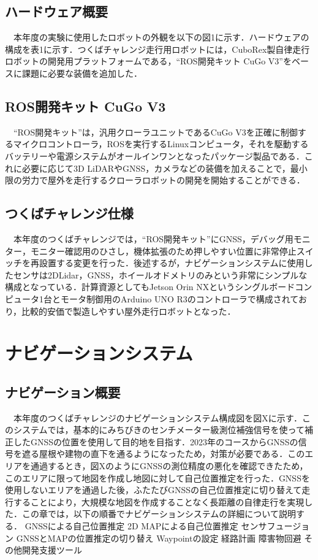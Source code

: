 \documentclass[platex,dvipdfmx]{rbproceedings}
\begin{document}
\subsection{ハードウェア概要}
　本年度の実験に使用したロボットの外観を以下の図1に示す．ハードウェアの構成を表1に示す．つくばチャレンジ走行用ロボットには，CuboRex製自律走行ロボットの開発用プラットフォームである，“ROS開発キット CuGo V3”をベースに課題に必要な装備を追加した．
\subsection{ROS開発キット CuGo V3}
　“ROS開発キット”は，汎用クローラユニットであるCuGo V3を正確に制御するマイクロコントローラ，ROSを実行するLinuxコンピュータ，それを駆動するバッテリーや電源システムがオールインワンとなったパッケージ製品である．これに必要に応じて3D LiDARやGNSS，カメラなどの装備を加えることで，最小限の労力で屋外を走行するクローラロボットの開発を開始することができる．
\subsection{つくばチャレンジ仕様}
　本年度のつくばチャレンジでは，“ROS開発キット”にGNSS，デバッグ用モニター，モニター確認用のひさし，機体拡張のため押しやすい位置に非常停止スイッチを再設置する変更を行った．後述するが，ナビゲーションシステムに使用したセンサは2DLidar，GNSS，ホイールオドメトリのみという非常にシンプルな構成となっている．計算資源としてもJetson Orin NXというシングルボードコンピュータ1台とモータ制御用のArduino UNO R3のコントローラで構成されており，比較的安価で製造しやすい屋外走行ロボットとなった．

\section{ナビゲーションシステム}
\subsection{ナビゲーション概要}
　本年度のつくばチャレンジのナビゲーションシステム構成図を図Xに示す．このシステムでは，基本的にみちびきのセンチメーター級測位補強信号を使って補正したGNSSの位置を使用して目的地を目指す．2023年のコースからGNSSの信号を遮る屋根や建物の直下を通るようになったため，対策が必要である．このエリアを通過するとき，図XのようにGNSSの測位精度の悪化を確認できたため，このエリアに限って地図を作成し地図に対して自己位置推定を行った．GNSSを使用しないエリアを通過した後，ふたたびGNSSの自己位置推定に切り替えて走行することにより，大規模な地図を作成することなく長距離の自律走行を実現した．この章では，以下の順番でナビゲーションシステムの詳細について説明する．
GNSSによる自己位置推定
2D MAPによる自己位置推定
センサフュージョン
GNSSとMAPの位置推定の切り替え
Waypointの設定
経路計画
障害物回避
その他開発支援ツール
\end{document}
